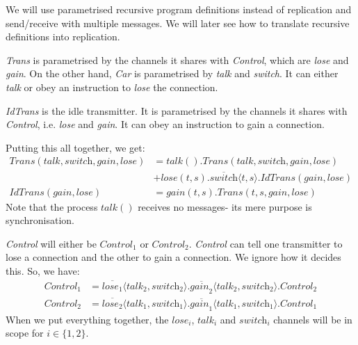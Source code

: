 \documentclass[a4paper, openany]{memoir}
\theoremstyle{definition}
\begin{document}
    We will use parametrised recursive program definitions instead of replication and send/receive with multiple messages. We will later see how to translate recursive definitions into replication. 
    
    \textit{Trans} is parametrised by the channels it shares with \textit{Control}, which are \textit{lose} and \textit{gain}. On the other hand, \textit{Car} is parametrised by \textit{talk} and \textit{switch}. It can either \textit{talk} or obey an instruction to \textit{lose} the connection.

    \textit{IdTrans} is the idle transmitter. It is parametrised by the channels it shares with \textit{Control}, i.e. \textit{lose} and \textit{gain}. It can obey an instruction to gain a connection.

    Putting this all together, we get:
    \begin{align*}
        \textit{Trans}(\textit{talk}, \textit{switch}, \textit{gain}, \textit{lose}) &= \textit{talk}().\textit{Trans}(\textit{talk}, \textit{switch}, \textit{gain}, \textit{lose}) \\
        &+ \textit{lose}(t, s).\overline{\textit{switch}}\langle t, s \rangle.\textit{IdTrans}(\textit{gain}, \textit{lose}) \\
        \textit{IdTrans}(\textit{gain}, \textit{lose}) &= \textit{gain}(t, s).\textit{Trans}(t, s, \textit{gain}, \textit{lose})
    \end{align*}
    \noindent Note that the process $\textit{talk}()$ receives no messages- its mere purpose is synchronisation.

    \textit{Control} will either be $\textit{Control}_1$ or $\textit{Control}_2$. \textit{Control} can tell one transmitter to lose a connection and the other to gain a connection. We ignore how it decides this. So, we have:
    \begin{align*}
        \textit{Control}_1 &= \overline{\textit{lose}_1} \langle \textit{talk}_2, \textit{switch}_2 \rangle.\overline{\textit{gain}_2} \langle \textit{talk}_2, \textit{switch}_2 \rangle.\textit{Control}_2 \\
        \textit{Control}_2 &= \overline{\textit{lose}_2} \langle \textit{talk}_1, \textit{switch}_1 \rangle.\overline{\textit{gain}_1} \langle \textit{talk}_1, \textit{switch}_1 \rangle.\textit{Control}_1
    \end{align*}
    When we put everything together, the $\textit{lose}_i$, $\textit{talk}_i$ and $\textit{switch}_i$ channels will be in scope for $i \in \{1, 2\}$.
\end{document}
